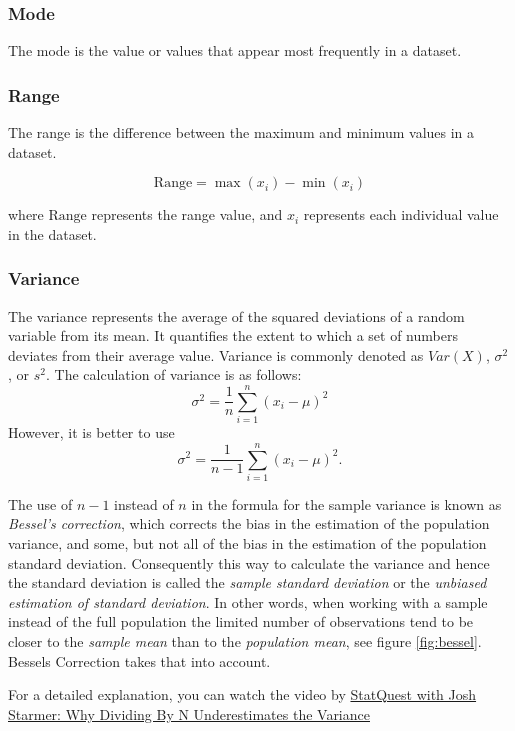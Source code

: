 \documentclass[
  12pt,
  oneside]{book}
\theoremstyle{definition}
\theoremstyle{definition}
\theoremstyle{definition}
\theoremstyle{definition}
\theoremstyle{remark}
\begin{document}
\hypertarget{mode}{%
\subsubsection{Mode}\label{mode}}

The mode is the value or values that appear most frequently in a dataset.

\hypertarget{range}{%
\subsubsection{Range}\label{range}}

The range is the difference between the maximum and minimum values in a dataset.

\[
\text{{Range}} = \max(x_i) - \min(x_i)
\]

where \(\text{{Range}}\) represents the range value, and \(x_i\) represents each individual value in the dataset.

\hypertarget{variance}{%
\subsubsection{Variance}\label{variance}}

The variance represents the average of the squared deviations of a random variable from its mean. It quantifies the extent to which a set of numbers deviates from their average value. Variance is commonly denoted as \(Var(X)\), \(\sigma^2\), or \(s^2\). The calculation of variance is as follows:
\[
\sigma^2={\frac{1}{n}}\sum _{i=1}^{n}(x_{i}-\mu )^{2}
\]
However, it is better to use
\[
\sigma^2={\frac{1}{n-1}}\sum _{i=1}^{n}(x_{i}-\mu )^{2}.
\]

The use of \(n - 1\) instead of \(n\) in the formula for the sample variance is known as \emph{Bessel's correction}, which corrects the bias in the estimation of the population variance, and some, but not all of the bias in the estimation of the population standard deviation.
Consequently this way to calculate the variance and hence the standard deviation is called the \emph{sample standard deviation} or the \emph{unbiased estimation of standard deviation}.
In other words, when working with a sample instead of the full population the limited number of observations tend to be closer to the \emph{sample mean} than to the \emph{population mean}, see figure \ref{fig:bessel}. Bessels Correction takes that into account.

For a detailed explanation, you can watch the video by \href{https://youtu.be/sHRBg6BhKjI}{StatQuest with Josh Starmer: Why Dividing By N Underestimates the Variance}
\end{document}
